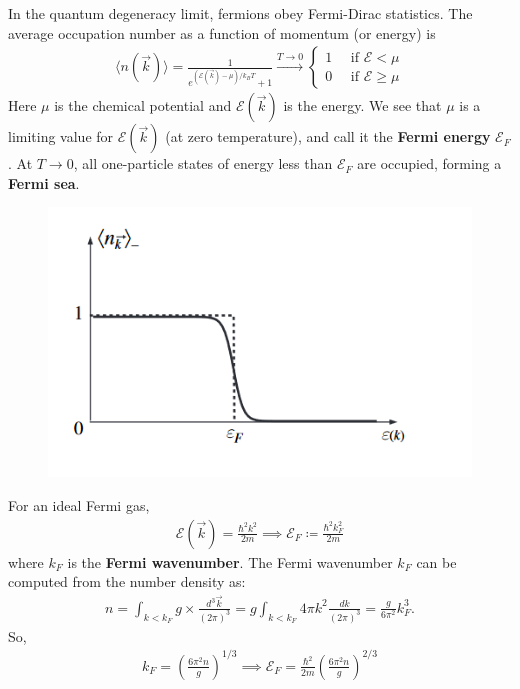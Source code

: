 \documentclass{book}
\theoremstyle{definition}
\newcommand{\f}[2]{\frac{#1}{#2}}
\newcommand{\lp}{\left(}
\newcommand{\rp}{\right)}
\begin{document}
In the quantum degeneracy limit, fermions obey Fermi-Dirac statistics. The average occupation number as a function of momentum (or energy) is 
\begin{align*}
	\langle n(\vec{k}) \rangle = \f{1}{ e^{(\mathcal{E}(\vec{k}) - \mu)/k_B T} + 1} \xrightarrow{T\to 0} \begin{cases}
		1 \quad \text{ if } \mathcal{E} < \mu\\ 
		0 \quad \text{ if } \mathcal{E} \geq \mu
	\end{cases}
\end{align*}
Here $\mu$ is the chemical potential and $\mathcal{E}(\vec{k})$ is the energy. We see that $\mu$ is a limiting value for $\mathcal{E}(\vec{k})$ (at zero temperature), and call it the \textbf{Fermi energy} $\mathcal{E}_F$. At $T\to 0$, all one-particle states of energy less than $\mathcal{E}_F$ are occupied, forming a \textbf{Fermi sea}. 


\begin{figure}[!htb]
	\centering
	\includegraphics[scale=0.8]{figures/fermi_dist.png}
\end{figure}


\noindent For an ideal Fermi gas, 
\begin{align*}
	\mathcal{E}(\vec{k}) = \f{\hbar^2 k^2}{2m} \implies \mathcal{E}_F \coloneqq \f{\hbar^2 k_F^2}{2m}
\end{align*}
where $k_F$ is the \textbf{Fermi wavenumber}. The Fermi wavenumber $k_F$ can be computed from the number density as:
\begin{align*}
	n = \int_{k < k_F} g \times  \f{d^3 \vec{k}}{(2\pi)^3} =  g\int_{k< k_F} 4\pi k^2 \f{dk}{(2\pi)^3} = \f{g}{6\pi^2}k_F^3.
\end{align*}
So,
\begin{align*}
	\boxed{k_F = \lp \f{6\pi^2 n}{g} \rp^{1/3} \implies \mathcal{E}_F = \f{\hbar^2}{2m} \lp \f{6\pi^2 n}{g} \rp^{2/3}}
\end{align*}
\end{document}
